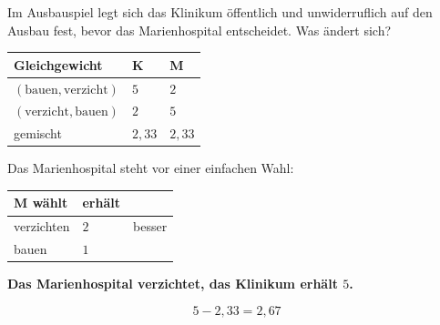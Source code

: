 \begin{aufgabe}
Im Ausbauspiel legt sich das Klinikum öffentlich und unwiderruflich auf den Ausbau fest, bevor das Marienhospital entscheidet. Was ändert sich?

\loesung
{}
\begin{center}
{\small
\renewcommand{\arraystretch}{1.5}
\begin{tabular}{@{}P{2.8cm}P{2.2cm}P{2.4cm}@{}}
\toprule
\textbf{Gleichgewicht} & \textbf{K} & \textbf{M}\\
\midrule
$(\text{bauen},\text{verzicht})$ & $5$ & $2$\\
$(\text{verzicht},\text{bauen})$ & $2$ & $5$\\
gemischt & $2{,}33$ & $2{,}33$\\
\bottomrule
\end{tabular}}
\end{center}

Das Marienhospital steht vor einer einfachen Wahl:
\begin{center}
\renewcommand{\arraystretch}{1.48}
\begin{tabular}{@{}P{2.4cm}P{2.0cm}P{2.6cm}@{}}
\toprule
\textbf{M wählt} & \textbf{erhält} & \\
\midrule
verzichten & $2$ & \textcolor{gruen}{besser}\\
bauen & $1$ & \\
\bottomrule
\end{tabular}
\end{center}

\begin{center}
\begin{minipage}{0.9\textwidth}
\textbf{Das Marienhospital verzichtet, das Klinikum erhält $5$.}
\end{minipage}
\end{center}

\[ 5 - 2{,}33 = 2{,}67 \]

\begin{center}
\begin{minipage}{0.88\textwidth}
\end{minipage}
\end{center}


\end{aufgabe}
